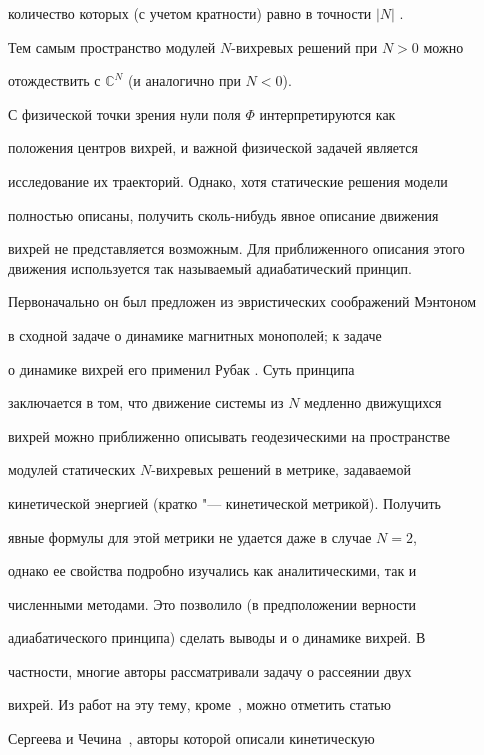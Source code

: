 количество которых  (с учетом кратности) равно в точности $|N|$ .

Тем самым пространство модулей $N$-вихревых решений при $N>0$ можно

отождествить с $\mathbb C^N$ (и аналогично при $N<0$).





С физической точки зрения нули поля $\Phi$ интерпретируются как

положения центров вихрей, и важной физической задачей является

исследование их траекторий. Однако, хотя статические решения модели

полностью описаны, получить сколь-нибудь явное описание движения

вихрей не представляется возможным. Для приближенного описания этого движения используется так называемый адиабатический принцип.

Первоначально он был предложен из эвристических соображений Мэнтоном

\cite{palv:ma} в сходной задаче о динамике магнитных монополей; к задаче

о динамике вихрей его применил Рубак \cite{palv:ru}. Суть принципа

заключается в том, что движение системы из $N$ медленно движущихся

вихрей можно приближенно описывать геодезическими на пространстве

модулей статических $N$-вихревых решений в метрике, задаваемой

кинетической энергией (кратко "--- кинетической метрикой). Получить

явные формулы для этой метрики не удается даже в случае $N=2$,

однако ее свойства подробно изучались как аналитическими, так и

численными методами. Это позволило (в предположении верности

адиабатического принципа) сделать выводы и о динамике вихрей. В

частности, многие авторы рассматривали задачу о рассеянии двух

вихрей. Из работ на эту тему, кроме~\cite{palv:ru}, можно отметить статью

Сергеева и Чечина~\cite{palv:SCh}, авторы которой описали кинетическую

